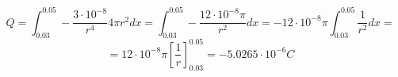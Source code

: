 \documentclass[12pt, a4papre]{article}
\begin{document}
	
	
	\section{}
	
	\begin{center}
		$$Q = \int_{0.03}^{0.05} -\frac{3\cdot10^{-8}}{r^4}4\pi r^2 dx = \int_{0.03}^{0.05} -\frac{12\cdot10^{-8}\pi}{r^2} dx=
		-12\cdot10^{-8}\pi\int_{0.03}^{0.05} \frac{1}{r^2} dx = $$
		$$ =12\cdot10^{-8}\pi \left[ \frac{1}{r}  \right]_{0.03}^{0.05} = -5.0265\cdot 10^{-6} C$$
		
	\end{center}
	
\end{document}
